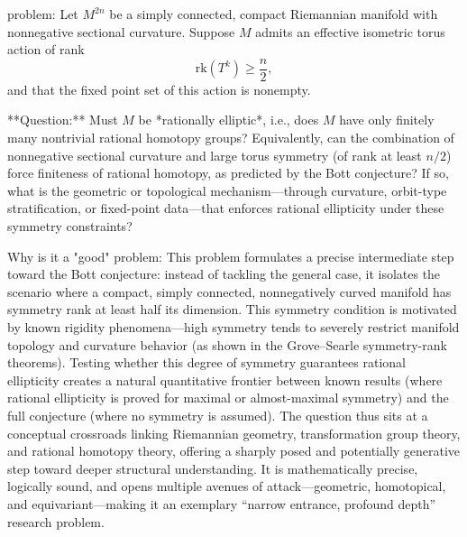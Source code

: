problem:  
Let \( M^{2n} \) be a simply connected, compact Riemannian manifold with nonnegative sectional curvature. Suppose \( M \) admits an effective isometric torus action of rank  
\[
\mathrm{rk}(T^k) \ge \frac{n}{2},
\]
and that the fixed point set of this action is nonempty.  

**Question:**  
Must \( M \) be *rationally elliptic*, i.e., does \( M \) have only finitely many nontrivial rational homotopy groups?  
Equivalently, can the combination of nonnegative sectional curvature and large torus symmetry (of rank at least \( n/2 \)) force finiteness of rational homotopy, as predicted by the Bott conjecture?  
If so, what is the geometric or topological mechanism—through curvature, orbit-type stratification, or fixed-point data—that enforces rational ellipticity under these symmetry constraints?  

Why is it a "good" problem:  
This problem formulates a precise intermediate step toward the Bott conjecture: instead of tackling the general case, it isolates the scenario where a compact, simply connected, nonnegatively curved manifold has symmetry rank at least half its dimension. This symmetry condition is motivated by known rigidity phenomena—high symmetry tends to severely restrict manifold topology and curvature behavior (as shown in the Grove–Searle symmetry-rank theorems). Testing whether this degree of symmetry guarantees rational ellipticity creates a natural quantitative frontier between known results (where rational ellipticity is proved for maximal or almost-maximal symmetry) and the full conjecture (where no symmetry is assumed). The question thus sits at a conceptual crossroads linking Riemannian geometry, transformation group theory, and rational homotopy theory, offering a sharply posed and potentially generative step toward deeper structural understanding. It is mathematically precise, logically sound, and opens multiple avenues of attack—geometric, homotopical, and equivariant—making it an exemplary “narrow entrance, profound depth” research problem.